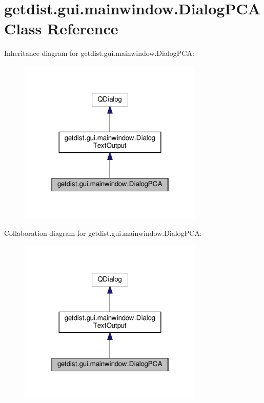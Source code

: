 \hypertarget{classgetdist_1_1gui_1_1mainwindow_1_1DialogPCA}{}\section{getdist.\+gui.\+mainwindow.\+Dialog\+P\+CA Class Reference}
\label{classgetdist_1_1gui_1_1mainwindow_1_1DialogPCA}


Inheritance diagram for getdist.\+gui.\+mainwindow.\+Dialog\+P\+CA\+:
\nopagebreak
\begin{figure}[H]
\begin{center}
\leavevmode
\includegraphics[width=250pt]{classgetdist_1_1gui_1_1mainwindow_1_1DialogPCA__inherit__graph}
\end{center}
\end{figure}


Collaboration diagram for getdist.\+gui.\+mainwindow.\+Dialog\+P\+CA\+:
\nopagebreak
\begin{figure}[H]
\begin{center}
\leavevmode
\includegraphics[width=250pt]{classgetdist_1_1gui_1_1mainwindow_1_1DialogPCA__coll__graph}
\end{center}
\end{figure}
